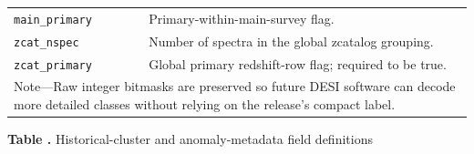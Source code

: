 \documentclass[twocolumn]{aastex701}
\begin{document}
\begin{center}
\begin{tabular}{p{}p{}}
\texttt{main\_primary} & Primary-within-main-survey flag. \\
\texttt{zcat\_nspec} & Number of spectra in the global zcatalog grouping. \\
\texttt{zcat\_primary} & Global primary redshift-row flag; required to be true. \\
\bottomrule
\multicolumn{2}{p{0.93\textwidth}}{\footnotesize Note---Raw integer bitmasks are preserved so
future DESI software can decode more detailed classes without relying on the release's compact
label.}\\
\end{tabular}
\end{center}

\clearpage
{}\label{tab:history-fields}
\begin{center}
\textbf{Table \thetable.} Historical-cluster and anomaly-metadata field definitions


\end{center}
\end{document}
